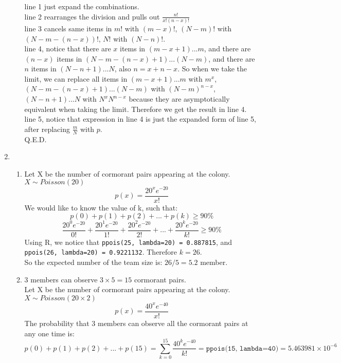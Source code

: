 \documentclass[11pt]{article}
\begin{document}
\begin{enumerate}[label=\textbf{Question \arabic*:},start=1]
\begin{enumerate}
line 1 just expand the combinations. \\
line 2 rearranges the division and pulls out  $\frac{n!}{x!(n-x)!}$ \\
line 3 cancels same items in $m!$ with $(m-x)!$,  $(N-m)!$ with $(N-m-(n-x))!$, $N!$ with $(N-n)!$. \\
line 4, notice that there are $x$ items in $(m-x+1)...m$, and there are $(n-x)$ items in $(N-m-(n-x)+1)...(N-m)$, and there are $n$ items in $(N-n+1)...N$, also $n = x + n-x$. So when we take the limit, we can replace all items in $(m-x+1)...m$ with $m^x$, $(N-m-(n-x)+1)...(N-m)$ with $(N-m)^{n-x}$, $(N-n+1)...N$ with $N^x N^{n-x}$ because they are asymptotically equivalent when taking the limit. Therefore we get the result in line 4. \\
line 5, notice that expression in line 4 is just the expanded form of line 5, after replacing $\frac{m}{N}$ with $p$.\\
Q.E.D.

\end{enumerate}




\vspace*{3mm}

\item 
\begin{enumerate}
\item
Let X be the number of cormorant pairs appearing at the colony. \( X \sim Poisson(20) \) \\
\[
p(x) = \frac{20^x e^{-20}}{x!}
\]
We would like to know the value of k, such that:
\[
p(0) + p(1) + p(2) + ... +  p(k) \geq 90\%
\]
\[
\frac{20^0 e^{-20}}{0!} + \frac{20^1 e^{-20}}{1!} + \frac{20^2 e^{-20}}{2!} + ... + \frac{20^k e^{-20}}{k!} \geq 90\%
\]
Using R, we notice that \texttt{ppois(25, lambda=20) = 0.887815}, and \texttt{ppois(26, lambda=20) = 0.9221132}. Therefore $k = 26$. \\
So the expected number of the team size is: $26/5 = 5.2$ member.\\

\item 
3 members can observe $3 \times 5 = 15$ cormorant pairs.\\
Let X be the number of cormorant pairs appearing at the colony. \( X \sim Poisson(20 \times 2) \) \\
\[
p(x) = \frac{40^x e^{-40}}{x!}
\]
The probability that 3 members can observe all the cormorant pairs at any one time is:
\[
p(0) + p(1) + p(2) + ... + p(15) = \sum_{k=0}^{15} \frac{40^k e^{-40}}{k!} = \texttt{ppois(15, lambda=40)} = 5.463981 \times 10^{-6}
\]


\end{enumerate}
\end{enumerate}
\end{document}
